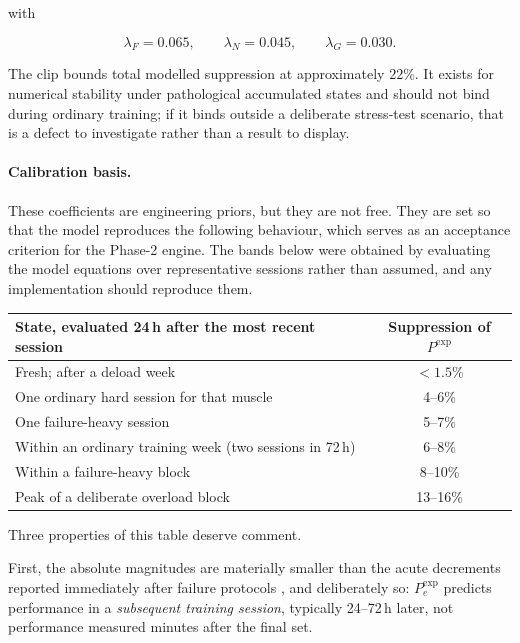 \documentclass[11pt]{article}
\begin{document}
with

\begin{equation}
\lambda_F=0.065,\qquad \lambda_N=0.045,\qquad \lambda_G=0.030.
\end{equation}

The clip bounds total modelled suppression at approximately $22\%$. It exists for numerical stability under pathological accumulated states and should not bind during ordinary training; if it binds outside a deliberate stress-test scenario, that is a defect to investigate rather than a result to display.

\paragraph{Calibration basis.} These coefficients are engineering priors, but they are not free. They are set so that the model reproduces the following behaviour, which serves as an acceptance criterion for the Phase-2 engine. The bands below were obtained by evaluating the model equations over representative sessions rather than assumed, and any implementation should reproduce them.

\begin{center}
\begin{tabular}{lc}
\toprule
State, evaluated 24\,h after the most recent session & Suppression of $P^{\mathrm{exp}}$ \\
\midrule
Fresh; after a deload week & $<1.5\%$ \\
One ordinary hard session for that muscle & 4--6\% \\
One failure-heavy session & 5--7\% \\
Within an ordinary training week (two sessions in 72\,h) & 6--8\% \\
Within a failure-heavy block & 8--10\% \\
Peak of a deliberate overload block & 13--16\% \\
\bottomrule
\end{tabular}
\end{center}

Three properties of this table deserve comment.

First, the absolute magnitudes are materially smaller than the acute decrements reported immediately after failure protocols \cite{moran2017}, and deliberately so: $P_e^{\mathrm{exp}}$ predicts performance in a \emph{subsequent training session}, typically 24--72\,h later, not performance measured minutes after the final set.
\end{document}
